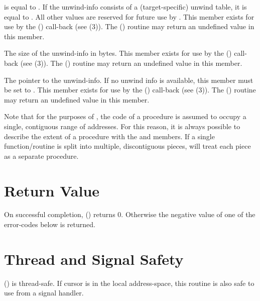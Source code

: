 \documentclass{article}
\begin{document}
\begin{description}
   is equal to .  If the
  unwind-info consists of a (target-specific) unwind table, it is
  equal to .  All other values are
  reserved for future use by .  This member exists
  for use by the () call-back (see
  (3)).  The
  () routine
  may return an undefined value in this member. \\
\item[\Type{int} \Var{unwind\_info\_size}] The size of the unwind-info
  in bytes.  This member exists for use by the
  () call-back (see
  (3)).  The
  () routine
  may return an undefined value in this member.\\
\item[\Type{void~*}\Var{unwind\_info}] The pointer to the unwind-info.
  If no unwind info is available, this member must be set to
  .  This member exists for use by the
  () call-back (see
  (3)).  The
  () routine
  may return an undefined value in this member.\\
\end{description}
Note that for the purposes of , the code of a
procedure is assumed to occupy a single, contiguous range of
addresses.  For this reason, it is always possible to describe the
extent of a procedure with the  and 
members.  If a single function/routine is split into multiple,
discontiguous pieces,  will treat each piece as a
separate procedure.

\section{Return Value}

On successful completion, () returns 0.
Otherwise the negative value of one of the error-codes below is
returned.

\section{Thread and Signal Safety}

() is thread-safe.  If cursor  is
in the local address-space, this routine is also safe to use from a
signal handler.
\end{document}
